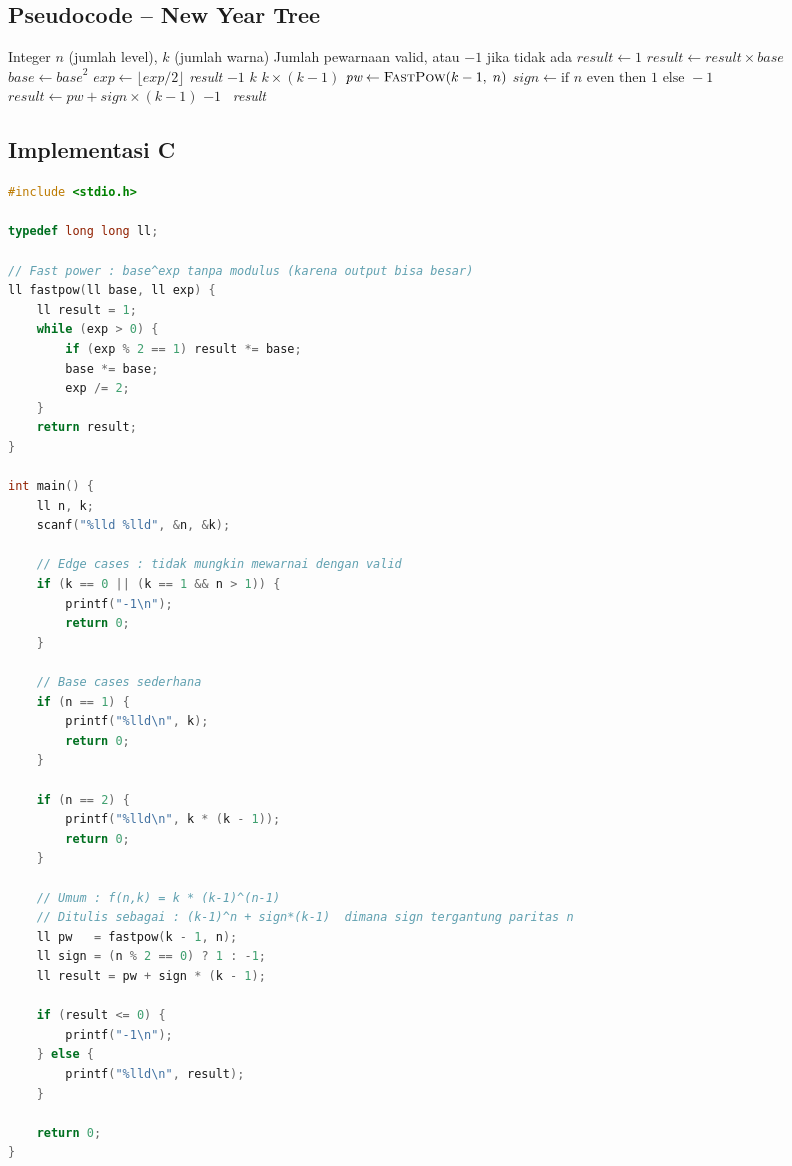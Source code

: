 \documentclass[12pt,a4paper]{article}
\theoremstyle{definition}
\begin{document}
\subsection{Pseudocode -- New Year Tree}

\begin{algorithm}[H]
\caption{New Year Tree -- Hitung Jumlah Pewarnaan Valid}
\begin{algorithmic}[1]
\Require Integer $n$ (jumlah level), $k$ (jumlah warna)
\Ensure Jumlah pewarnaan valid, atau $-1$ jika tidak ada
  \State $\textit{result} \gets 1$
      \State $\textit{result} \gets \textit{result} \times \textit{base}$
    \EndIf
    \State $\textit{base} \gets \textit{base}^2$
    \State $\textit{exp} \gets \lfloor\textit{exp}/2\rfloor$
  \EndWhile
  \State \Return \textit{result}
\EndFunction
\Statex
{}
  \Return $-1$
\EndIf
{} \Return $k$ \EndIf
{} \Return $k\times(k-1)$ \EndIf
\State $\textit{pw} \gets \Call{FastPow}{k-1,\; n}$
\State $\textit{sign} \gets \text{if } n \text{ even then } 1 \text{ else } -1$
\State $\textit{result} \gets \textit{pw} + \textit{sign}\times(k-1)$
 \Return $-1$ \Else\ \Return \textit{result} \EndIf
\end{algorithmic}
\end{algorithm}

\subsection{Implementasi C}

\begin{lstlisting}[language=C, caption={EOlymp New Year Tree -- Solusi dengan Fast Power}]
#include <stdio.h>

typedef long long ll;

// Fast power : base^exp tanpa modulus (karena output bisa besar)
ll fastpow(ll base, ll exp) {
    ll result = 1;
    while (exp > 0) {
        if (exp % 2 == 1) result *= base;
        base *= base;
        exp /= 2;
    }
    return result;
}

int main() {
    ll n, k;
    scanf("%lld %lld", &n, &k);

    // Edge cases : tidak mungkin mewarnai dengan valid
    if (k == 0 || (k == 1 && n > 1)) {
        printf("-1\n");
        return 0;
    }

    // Base cases sederhana
    if (n == 1) {
        printf("%lld\n", k);
        return 0;
    }

    if (n == 2) {
        printf("%lld\n", k * (k - 1));
        return 0;
    }

    // Umum : f(n,k) = k * (k-1)^(n-1)
    // Ditulis sebagai : (k-1)^n + sign*(k-1)  dimana sign tergantung paritas n
    ll pw   = fastpow(k - 1, n);
    ll sign = (n % 2 == 0) ? 1 : -1;
    ll result = pw + sign * (k - 1);

    if (result <= 0) {
        printf("-1\n");
    } else {
        printf("%lld\n", result);
    }

    return 0;
}
\end{lstlisting}
\end{document}
